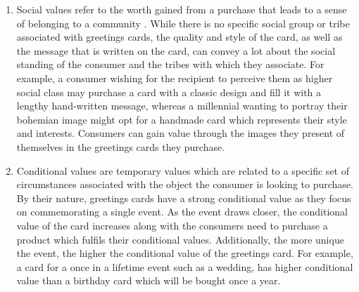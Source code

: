 \begin{enumerate}
  \item Social values refer to the worth gained from a purchase that leads to a sense of belonging to a community \citep{sheth1991we}. While there is no specific social group or tribe \citep{canniford2011manage} associated with greetings cards, the quality and style of the card, as well as the message that is written on the card, can convey a lot about the social standing of the consumer and the tribes with which they associate. For example, a consumer wishing for the recipient to perceive them as higher social class may purchase a card with a classic design and fill it with a lengthy hand-written message, whereas a millennial wanting to portray their bohemian image might opt for a handmade card which represents their style and interests. Consumers can gain value through the images they present of themselves in the greetings cards they purchase.
  \item Conditional values \citep{sheth1991we} are temporary values which are related to a specific set of circumstances associated with the object the consumer is looking to purchase. By their nature, greetings cards have a strong conditional value as they focus on commemorating a single event. As the event draws closer, the conditional value of the card increases along with the consumers need to purchase a product which fulfils their conditional values. Additionally, the more unique the event, the higher the conditional value of the greetings card. For example, a card for a once in a lifetime event such as a wedding, has higher conditional value than a birthday card which will be bought once a year.
\end{enumerate}
